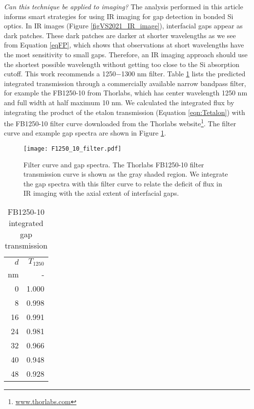 \documentclass[osajnl,twocolumn,showpacs,superscriptaddress,11pt]{revtex4-1} %
\begin{document}
\emph{Can this technique be applied to imaging?}  The analysis performed in this article informs smart strategies for using IR imaging for gap detection in bonded Si optics.  In IR images (Figure \ref{figVS2021_IR_image}), interfacial gaps appear as dark patches.  These dark patches are darker at shorter wavelengths as we see from Equation \ref{eqFP}, which shows that observations at short wavelengths have the most sensitivity to small gaps.  Therefore, an IR imaging approach should use the shortest possible wavelength without getting too close to the Si absorption cutoff.  This work recommends a 1250$-$1300 nm filter.  Table \ref{tbl_FB1250} lists the predicted integrated transmission through a commercially available narrow bandpass filter, for example the FB1250-10 from Thorlabs, which has center wavelength 1250 nm and full width at half maximum 10 nm.  We calculated the integrated flux by integrating the product of the etalon transmission (Equation \ref{eqn:Tetalon}) with the FB1250-10 filter curve downloaded from the Thorlabs website\footnote{\url{www.thorlabs.com}}.  The filter curve and example gap spectra are shown in Figure \ref{figFB1250-10}.

\begin{figure}[htbp]
\texttt{[image: F1250\_10\_filter.pdf]}
\caption{\label{figFB1250-10} Filter curve and gap spectra.  The Thorlabs FB1250-10 filter transmission curve is shown as the gray shaded region.  We integrate the gap spectra with this filter curve to relate the deficit of flux in IR imaging with the axial extent of interfacial gaps.}
\end{figure}

\begin{table}[h!]
\caption{FB1250-10 integrated gap transmission \label{tbl_FB1250}}
\begin{center}
    \begin{tabular}{ r r}
    \hline
    $d$ & $T_{1250}$\\
    nm  & - \\
    \hline
      0 &                   1.000 \\
      8 &                   0.998 \\
     16 &                   0.991 \\
     24 &                   0.981 \\
     32 &                   0.966 \\
     40 &                   0.948 \\
     48 &                   0.928 \\
    \hline
    \end{tabular}
\end{center}
\end{table}
\end{document}
